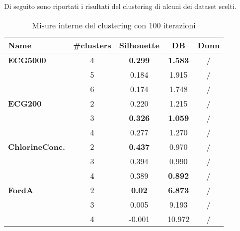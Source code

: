 Di seguito sono riportati i risultati del clustering di alcuni dei dataset scelti.
\begin{table}[H]
	\centering
	\begin{tabularx}{\textwidth}{X | c c c c}
		\hline
		\textbf{Name} & \textbf{\#clusters} & \textbf{Silhouette} & \textbf{DB} & \textbf{Dunn} \\
		\hline
		\textbf{ECG5000} & 4 & \textbf{0.299} & \textbf{1.583} & / \\
		& 5 & 0.184 & 1.915 & / \\
		& 6 & 0.174 & 1.748 & / \\
		\hline
		\textbf{ECG200} & 2 & 0.220 & 1.215 & / \\
		& 3 & \textbf{0.326} & \textbf{1.059} & / \\
		& 4 & 0.277 & 1.270 & / \\
		\hline
		\textbf{ChlorineConc.} & 2 & \textbf{0.437} & 0.970 & / \\
		& 3 & 0.394 & 0.990 & / \\
		& 4 & 0.389 & \textbf{0.892} & / \\
		\hline
		\textbf{FordA} & 2 & \textbf{0.02} & \textbf{6.873} & / \\
		& 3 & 0.005 & 9.193 & / \\
		& 4 & -0.001 & 10.972 & / \\
	\end{tabularx}
	\caption{Misure interne del clustering con 100 iterazioni}
	\label{tab:clustering100_int}
\end{table}

